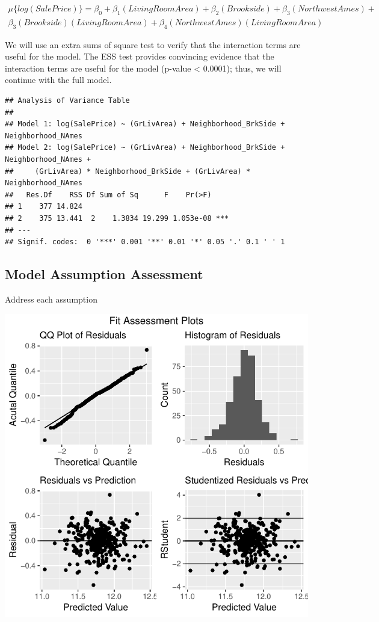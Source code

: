 \documentclass[american,]{article}
\begin{document}
\begin{align}
\mu \lbrace log(SalePrice) \rbrace = \beta_0 + \beta_1(LivingRoomArea) +  \beta_2(Brookside) +\beta_3(NorthwestAmes) + \nonumber\\
\beta_3(Brookside)(LivingRoomArea) + \beta_4(NorthwestAmes)(LivingRoomArea) \label{eq:full}
\end{align}

We will use an extra sums of square test to verify that the interaction
terms are useful for the model. The ESS test provides convincing
evidence that the interaction terms are useful for the model (p-value
\textless{} 0.0001); thus, we will continue with the full model.

\begin{verbatim}
## Analysis of Variance Table
## 
## Model 1: log(SalePrice) ~ (GrLivArea) + Neighborhood_BrkSide + Neighborhood_NAmes
## Model 2: log(SalePrice) ~ (GrLivArea) + Neighborhood_BrkSide + Neighborhood_NAmes + 
##     (GrLivArea) * Neighborhood_BrkSide + (GrLivArea) * Neighborhood_NAmes
##   Res.Df    RSS Df Sum of Sq      F    Pr(>F)    
## 1    377 14.824                                  
## 2    375 13.441  2    1.3834 19.299 1.053e-08 ***
## ---
## Signif. codes:  0 '***' 0.001 '**' 0.01 '*' 0.05 '.' 0.1 ' ' 1
\end{verbatim}

\hypertarget{model-assumption-assessment}{%
\subsection{Model Assumption
Assessment}\label{model-assumption-assessment}}

Address each assumption

\begin{center}\includegraphics{HousePriceRegressionAnalysis_files/figure-latex/diag-plots-1} \end{center}
\end{document}
